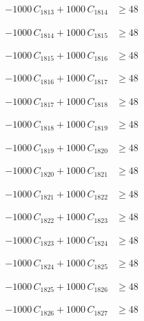 \documentclass[a4paper,11pt]{article}
\begin{document}
\begin{align}
-1000\,C_{1813} + 1000\,C_{1814} &\geq 48 \nonumber
\end{align}

\begin{align}
-1000\,C_{1814} + 1000\,C_{1815} &\geq 48 \nonumber
\end{align}

\begin{align}
-1000\,C_{1815} + 1000\,C_{1816} &\geq 48 \nonumber
\end{align}

\begin{align}
-1000\,C_{1816} + 1000\,C_{1817} &\geq 48 \nonumber
\end{align}

\begin{align}
-1000\,C_{1817} + 1000\,C_{1818} &\geq 48 \nonumber
\end{align}

\begin{align}
-1000\,C_{1818} + 1000\,C_{1819} &\geq 48 \nonumber
\end{align}

\begin{align}
-1000\,C_{1819} + 1000\,C_{1820} &\geq 48 \nonumber
\end{align}

\begin{align}
-1000\,C_{1820} + 1000\,C_{1821} &\geq 48 \nonumber
\end{align}

\begin{align}
-1000\,C_{1821} + 1000\,C_{1822} &\geq 48 \nonumber
\end{align}

\begin{align}
-1000\,C_{1822} + 1000\,C_{1823} &\geq 48 \nonumber
\end{align}

\begin{align}
-1000\,C_{1823} + 1000\,C_{1824} &\geq 48 \nonumber
\end{align}

\begin{align}
-1000\,C_{1824} + 1000\,C_{1825} &\geq 48 \nonumber
\end{align}

\begin{align}
-1000\,C_{1825} + 1000\,C_{1826} &\geq 48 \nonumber
\end{align}

\begin{align}
-1000\,C_{1826} + 1000\,C_{1827} &\geq 48 \nonumber
\end{align}
\end{document}
